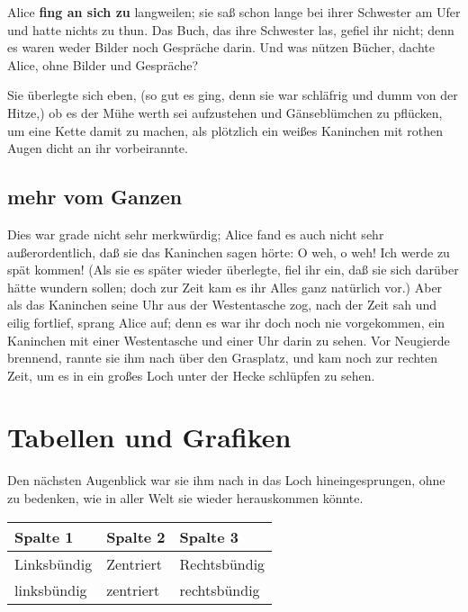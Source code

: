 \documentclass[DIV=calc,10pt,parskip=half,twocolumn]{scrartcl}
\begin{document}
Alice {\bfseries fing an sich zu} langweilen; sie saß schon lange bei ihrer Schwester am
Ufer und hatte nichts zu thun. Das Buch, das ihre Schwester las, gefiel ihr
nicht; denn es waren weder Bilder noch Gespräche darin. \grqq{} Und was nützen
Bücher,\grqq{}  dachte Alice, \grqq{}ohne Bilder und Gespräche?\grqq 

Sie überlegte sich eben, (so gut es ging, denn sie war schläfrig und dumm von
der Hitze,) ob es der Mühe werth sei aufzustehen und Gänseblümchen zu pflücken,
um eine Kette damit zu machen, als plötzlich ein weißes Kaninchen mit rothen
Augen dicht an ihr vorbeirannte.

\subsection{mehr vom Ganzen}

Dies war grade nicht sehr merkwürdig; Alice fand es auch nicht sehr
außerordentlich, daß sie das Kaninchen sagen hörte: \grqq{} O weh, o weh! Ich werde zu
spät kommen!\grqq{}  (Als sie es später wieder überlegte, fiel ihr ein, daß sie sich
darüber hätte wundern sollen; doch zur Zeit kam es ihr Alles ganz natürlich
vor.) Aber als das Kaninchen seine Uhr aus der Westentasche zog, nach der Zeit
sah und eilig fortlief, sprang Alice auf; denn es war ihr doch noch nie
vorgekommen, ein Kaninchen mit einer Westentasche und einer Uhr darin zu sehen.
Vor Neugierde brennend, rannte sie ihm nach über den Grasplatz, und kam noch
zur rechten Zeit, um es in ein großes Loch unter der Hecke schlüpfen zu sehen.




\section{Tabellen und Grafiken}

Den nächsten Augenblick war sie ihm nach in das Loch hineingesprungen, ohne zu
bedenken, wie in aller Welt sie wieder herauskommen könnte.

\begin{center}
\begin{tabular}{lll}
  \toprule
   Spalte 1 &  Spalte 2 & Spalte 3\\
   \midrule
   Linksbündig & Zentriert & Rechtsbündig\\
   linksbündig & zentriert & rechtsbündig\\
   \bottomrule
\end{tabular}
\end{center}
\end{document}
